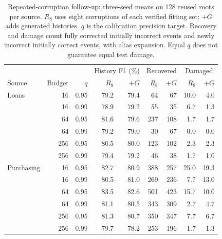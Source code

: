 \begin{table}[t]
\centering\small
\caption{Repeated-corruption follow-up: three-seed means on 128 reused roots per source. $R_8$ uses eight corruptions of each verified fitting set; $+G$ adds generated histories. $q$ is the calibration precision target. Recovery and damage count fully corrected initially incorrect events and newly incorrect initially correct events, with alias expansion. Equal $q$ does not guarantee equal test damage.}
\label{tab:repeated-corruption}
\setlength{\tabcolsep}{4pt}
\begin{tabular}{lrr rr rr rr}
\toprule
 & & & \multicolumn{2}{c}{History F1 (\%)} & \multicolumn{2}{c}{Recovered} & \multicolumn{2}{c}{Damaged} \\
Source & Budget & $q$ & $R_8$ & $+G$ & $R_8$ & $+G$ & $R_8$ & $+G$ \\ \midrule
Loans & 16 & 0.95 & 79.2 & 79.4 & 64 & 67 & 10.0 & 4.0 \\
 & 16 & 0.99 & 78.9 & 79.2 & 55 & 35 & 6.7 & 1.3 \\
 & 64 & 0.95 & 81.6 & 79.6 & 237 & 108 & 1.7 & 1.7 \\
 & 64 & 0.99 & 79.2 & 79.0 & 30 & 67 & 0.0 & 0.0 \\
 & 256 & 0.95 & 80.5 & 80.0 & 123 & 102 & 2.3 & 2.3 \\
 & 256 & 0.99 & 79.4 & 79.2 & 46 & 38 & 1.7 & 1.0 \\
\midrule
Purchasing & 16 & 0.95 & 82.7 & 80.9 & 388 & 257 & 25.0 & 19.3 \\
 & 16 & 0.99 & 80.5 & 81.0 & 269 & 236 & 7.7 & 13.0 \\
 & 64 & 0.95 & 83.5 & 82.6 & 501 & 423 & 15.7 & 10.0 \\
 & 64 & 0.99 & 81.1 & 80.5 & 343 & 309 & 2.7 & 4.7 \\
 & 256 & 0.95 & 81.3 & 80.7 & 350 & 347 & 7.7 & 6.7 \\
 & 256 & 0.99 & 79.7 & 78.2 & 253 & 196 & 1.7 & 1.3 \\
\bottomrule
\end{tabular}
\end{table}
